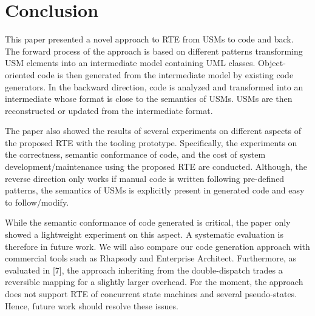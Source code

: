 \section{Conclusion}
\label{sec:conclusion}
This paper presented a novel approach to RTE from USMs to code and back. The forward process of the approach is based on different patterns transforming USM elements into an intermediate model containing UML classes. Object-oriented code is then generated from the intermediate model by existing code generators. In the backward direction, code is analyzed and transformed into an intermediate whose format is close to the semantics of USMs. USMs are then reconstructed or updated from the intermediate format. 
 
The paper also showed the results of several experiments on different aspects of the proposed RTE with the tooling prototype. Specifically, the experiments on the correctness, semantic conformance of code, and the cost of system development/maintenance using the proposed RTE are conducted. Although, the reverse direction only works if manual code is written following pre-defined patterns, the semantics of USMs is explicitly present in generated code and easy to follow/modify.

While the semantic conformance of code generated is critical, the paper only showed a lightweight experiment on this aspect. A systematic evaluation is therefore in future work. We will also compare our code generation approach with commercial tools such as Rhapsody and Enterprise Architect. Furthermore, as evaluated in [7], the approach inheriting from the double-dispatch trades a reversible mapping for a slightly larger overhead. For the moment, the approach does not support RTE of concurrent state machines and several pseudo-states. Hence, future work should resolve these issues.

